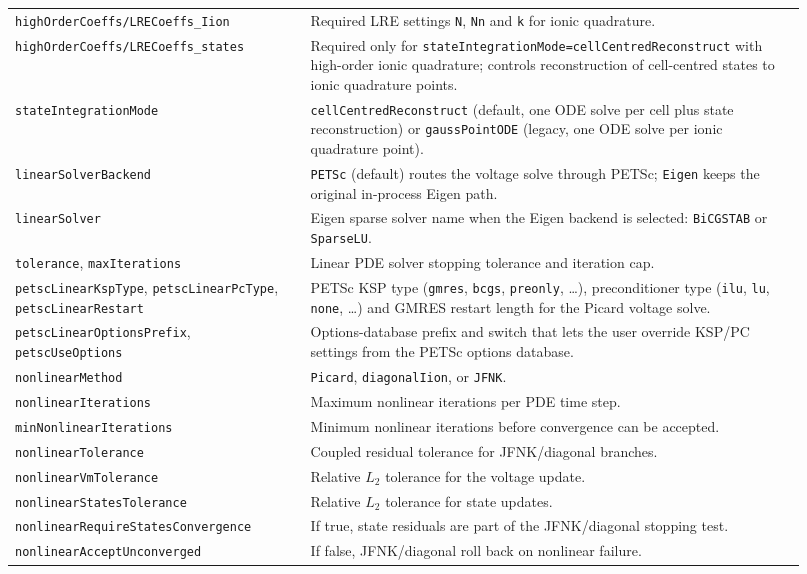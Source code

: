 \documentclass[11pt,a4paper]{article}
\newcommand{\code}[1]{\texttt{\small #1}}
\begin{document}
\begin{longtable}{@{}p{0.34\linewidth}p{0.58\linewidth}@{}}
\code{highOrderCoeffs/LRECoeffs\_Iion} & Required LRE settings \code{N}, \code{Nn} and \code{k} for ionic quadrature. \\
\code{highOrderCoeffs/LRECoeffs\_states} & Required only for \code{stateIntegrationMode=cellCentredReconstruct} with high-order ionic quadrature; controls reconstruction of cell-centred states to ionic quadrature points. \\
\code{stateIntegrationMode} & \code{cellCentredReconstruct} (default, one ODE solve per cell plus state reconstruction) or \code{gaussPointODE} (legacy, one ODE solve per ionic quadrature point). \\
\code{linearSolverBackend} & \code{PETSc} (default) routes the voltage solve through PETSc; \code{Eigen} keeps the original in-process Eigen path. \\
\code{linearSolver} & Eigen sparse solver name when the Eigen backend is selected: \code{BiCGSTAB} or \code{SparseLU}. \\
\code{tolerance}, \code{maxIterations} & Linear PDE solver stopping tolerance and iteration cap. \\
\code{petscLinearKspType}, \code{petscLinearPcType}, \code{petscLinearRestart} & PETSc KSP type (\code{gmres}, \code{bcgs}, \code{preonly}, \ldots), preconditioner type (\code{ilu}, \code{lu}, \code{none}, \ldots) and GMRES restart length for the Picard voltage solve. \\
\code{petscLinearOptionsPrefix}, \code{petscUseOptions} & Options-database prefix and switch that lets the user override KSP/PC settings from the PETSc options database. \\
\code{nonlinearMethod} & \code{Picard}, \code{diagonalIion}, or \code{JFNK}. \\
\code{nonlinearIterations} & Maximum nonlinear iterations per PDE time step. \\
\code{minNonlinearIterations} & Minimum nonlinear iterations before convergence can be accepted. \\
\code{nonlinearTolerance} & Coupled residual tolerance for JFNK/diagonal branches. \\
\code{nonlinearVmTolerance} & Relative $L_2$ tolerance for the voltage update. \\
\code{nonlinearStatesTolerance} & Relative $L_2$ tolerance for state updates. \\
\code{nonlinearRequireStatesConvergence} & If true, state residuals are part of the JFNK/diagonal stopping test. \\
\code{nonlinearAcceptUnconverged} & If false, JFNK/diagonal roll back on nonlinear failure. \\

\end{longtable}
\end{document}
